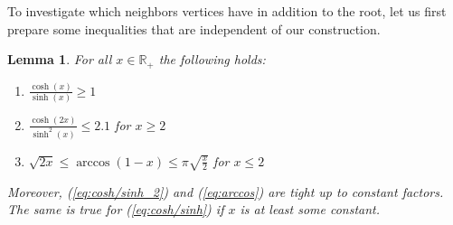 \documentclass[11pt]{article}
\newtheorem{lemma}[theorem]{Lemma}
\begin{document}
%
To investigate which neighbors vertices have in addition to the root, let us first prepare some inequalities that are independent of our construction.
%
\begin{lemma}\label{lem:hyp-ineq}
    \newlength{\extraspace}
    \setlength{\extraspace}{0.3em}
    For all $ x \in \mathbb{R}_+ $ the following holds:
    \vspace{\extraspace / 2}
    \begin{enumerate}[label={(\arabic*)}]
        \setlength{\itemsep}{\extraspace}
        \item \label{eq:cosh/sinh}
            $ \frac{\cosh(x)}{\sinh(x)} \geq 1 $
        \item \label{eq:cosh/sinh_2}
            $ \frac{\cosh(2x)}{\sinh^2(x)} \leq 2.1 $ for $ x \geq 2 $
        \item \label{eq:arccos}
            $ \sqrt{2x} \leq \arccos(1-x) \leq \pi \sqrt{\frac{x}{2}} $ for $ x \leq 2 $
        \end{enumerate} \vspace{\extraspace / 2} Moreover, (\ref{eq:cosh/sinh_2}) and (\ref{eq:arccos}) are tight up to constant factors.
        The same is true for (\ref{eq:cosh/sinh}) if $x$ is at least some constant.
\end{lemma}
%
\end{document}
